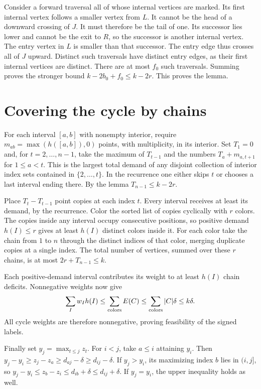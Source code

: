 \documentclass[11pt]{article}
\begin{document}
Consider a forward traversal all of whose internal vertices are marked. Its first internal vertex follows a smaller vertex from $L$. It cannot be the head of a downward crossing of $J$. It must therefore be the tail of one. Its successor lies lower and cannot be the exit to $R$, so the successor is another internal vertex. The entry vertex in $L$ is smaller than that successor. The entry edge thus crosses all of $J$ upward. Distinct such traversals have distinct entry edges, as their first internal vertices are distinct. There are at most $f_0$ such traversals. Summing proves the stronger bound $k-2b_0+f_0\le k-2r$. This proves the lemma.

\section{Covering the cycle by chains}

For each interval $[a,b]$ with nonempty interior, require $m_{ab}=\max(h([a,b]),0)$ points, with multiplicity, in its interior. Set $T_1=0$ and, for $t=2,\ldots,n-1$, take the maximum of $T_{t-1}$ and the numbers $T_a+m_{a,t+1}$ for $1\le a<t$. This is the largest total demand of any disjoint collection of interior index sets contained in $\{2,\dots,t\}$. In the recurrence one either skips $t$ or chooses a last interval ending there. By the lemma $T_{n-1}\le k-2r$.

Place $T_t-T_{t-1}$ point copies at each index $t$. Every interval receives at least its demand, by the recurrence. Color the sorted list of copies cyclically with $r$ colors. The copies inside any interval occupy consecutive positions, so positive demand $h(I)\le r$ gives at least $h(I)$ distinct colors inside it. For each color take the chain from $1$ to $n$ through the distinct indices of that color, merging duplicate copies at a single index. The total number of vertices, summed over these $r$ chains, is at most $2r+T_{n-1}\le k$.

Each positive-demand interval contributes its weight to at least $h(I)$ chain deficits. Nonnegative weights now give
\[
 \sum_I w_Ih(I)\le \sum_{\rm colors} E(C)\le \sum_{\rm colors}|C|\delta\le k\delta.
\]
All cycle weights are therefore nonnegative, proving feasibility of the signed labels.

Finally set $y_j=\max_{t\le j}z_t$. For $i<j$, take $a\le i$ attaining $y_i$. Then $y_j-y_i\ge z_j-z_a\ge d_{aj}-\delta\ge d_{ij}-\delta$. If $y_j>y_i$, its maximizing index $b$ lies in $(i,j]$, so $y_j-y_i\le z_b-z_i\le d_{ib}+\delta\le d_{ij}+\delta$. If $y_j=y_i$, the upper inequality holds as well.
\end{document}
